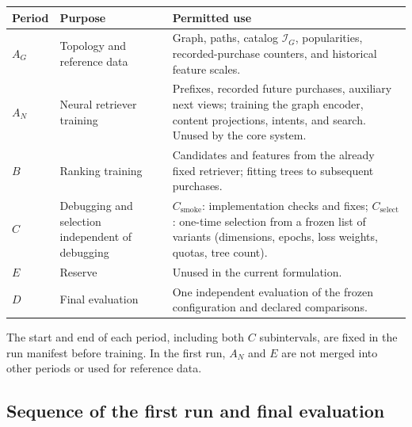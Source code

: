 \documentclass[12pt,a4paper]{article}
\theoremstyle{plainru}
\begin{document}
{\small
\begin{longtable}{L{0.10\textwidth}L{0.30\textwidth}L{0.47\textwidth}}
\toprule Period & Purpose & Permitted use \\\midrule\endhead
$A_G$ & Topology and reference data &
Graph, paths, catalog $\mathcal I_G$, popularities, recorded-purchase counters,
and historical feature scales. \\
$A_N$ & Neural retriever training &
Prefixes, recorded future purchases, auxiliary next views;
training the graph encoder, content projections, intents, and search.
Unused by the core system. \\
$B$ & Ranking training &
Candidates and features from the already fixed retriever;
fitting trees to subsequent purchases. \\
$C$ & Debugging and selection independent of debugging &
$C_{\mathrm{smoke}}$: implementation checks and fixes;
$C_{\mathrm{select}}$: one-time selection from a frozen list of variants
(dimensions, epochs, loss weights, quotas, tree count). \\
$E$ & Reserve & Unused in the current formulation. \\
$D$ & Final evaluation &
One independent evaluation of the frozen configuration and declared comparisons. \\
\bottomrule
\end{longtable}}

The start and end of each period, including both $C$ subintervals,
are fixed in the run manifest before training. In the first run, $A_N$ and $E$
are not merged into other periods or used for reference data.

\subsection{Sequence of the first run and final evaluation}
\label{sec:eval-stages}
\end{document}
